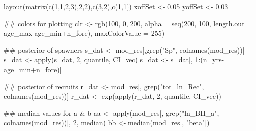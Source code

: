 \documentclass[11pt,]{article}
\newenvironment{Shaded}{}{}
\newcommand{\CommentTok}[1]{\textcolor[rgb]{0.00,0.50,0.00}{#1}}
\newcommand{\DataTypeTok}[1]{#1}
\newcommand{\DecValTok}[1]{#1}
\newcommand{\FloatTok}[1]{#1}
\newcommand{\KeywordTok}[1]{\textcolor[rgb]{0.00,0.00,1.00}{#1}}
\newcommand{\NormalTok}[1]{#1}
\newcommand{\OperatorTok}[1]{#1}
\newcommand{\StringTok}[1]{\textcolor[rgb]{0.00,0.50,0.50}{#1}}
\begin{document}
\begin{Shaded}
\begin{Highlighting}[]
\KeywordTok{layout}\NormalTok{(}\KeywordTok{matrix}\NormalTok{(}\KeywordTok{c}\NormalTok{(}\DecValTok{1}\NormalTok{,}\DecValTok{1}\NormalTok{,}\DecValTok{2}\NormalTok{,}\DecValTok{3}\NormalTok{),}\DecValTok{2}\NormalTok{,}\DecValTok{2}\NormalTok{),}\KeywordTok{c}\NormalTok{(}\DecValTok{3}\NormalTok{,}\DecValTok{2}\NormalTok{),}\KeywordTok{c}\NormalTok{(}\DecValTok{1}\NormalTok{,}\DecValTok{1}\NormalTok{))}
\NormalTok{xoffSet <-}\StringTok{ }\FloatTok{0.05}
\NormalTok{yoffSet <-}\StringTok{ }\FloatTok{0.03}

\CommentTok{## colors for plotting}
\NormalTok{clr <-}\StringTok{ }\KeywordTok{rgb}\NormalTok{(}\DecValTok{100}\NormalTok{, }\DecValTok{0}\NormalTok{, }\DecValTok{200}\NormalTok{,}
           \DataTypeTok{alpha =} \KeywordTok{seq}\NormalTok{(}\DecValTok{200}\NormalTok{, }\DecValTok{100}\NormalTok{,}
                       \DataTypeTok{length.out =}\NormalTok{ age_max}\OperatorTok{-}\NormalTok{age_min}\OperatorTok{+}\NormalTok{n_fore),}
           \DataTypeTok{maxColorValue =} \DecValTok{255}\NormalTok{)}

\CommentTok{## posterior of spawners}
\NormalTok{s_dat <-}\StringTok{ }\NormalTok{mod_res[,}\KeywordTok{grep}\NormalTok{(}\StringTok{"Sp"}\NormalTok{, }\KeywordTok{colnames}\NormalTok{(mod_res))]}
\NormalTok{s_dat <-}\StringTok{ }\KeywordTok{apply}\NormalTok{(s_dat, }\DecValTok{2}\NormalTok{, quantile, CI_vec)}
\NormalTok{s_dat <-}\StringTok{ }\NormalTok{s_dat[, }\DecValTok{1}\OperatorTok{:}\NormalTok{(n_yrs}\OperatorTok{-}\NormalTok{age_min}\OperatorTok{+}\NormalTok{n_fore)]}

\CommentTok{## posterior of recruits}
\NormalTok{r_dat <-}\StringTok{ }\NormalTok{mod_res[, }\KeywordTok{grep}\NormalTok{(}\StringTok{"tot_ln_Rec"}\NormalTok{, }\KeywordTok{colnames}\NormalTok{(mod_res))]}
\NormalTok{r_dat <-}\StringTok{ }\KeywordTok{exp}\NormalTok{(}\KeywordTok{apply}\NormalTok{(r_dat, }\DecValTok{2}\NormalTok{, quantile, CI_vec))}

\CommentTok{## median values for a & b}
\NormalTok{aa <-}\StringTok{ }\KeywordTok{apply}\NormalTok{(mod_res[, }\KeywordTok{grep}\NormalTok{(}\StringTok{"ln_BH_a"}\NormalTok{, }\KeywordTok{colnames}\NormalTok{(mod_res))], }\DecValTok{2}\NormalTok{, median)}
\NormalTok{bb <-}\StringTok{ }\KeywordTok{median}\NormalTok{(mod_res[, }\StringTok{"beta"}\NormalTok{])}


\end{Highlighting}
\end{Shaded}
\end{document}
